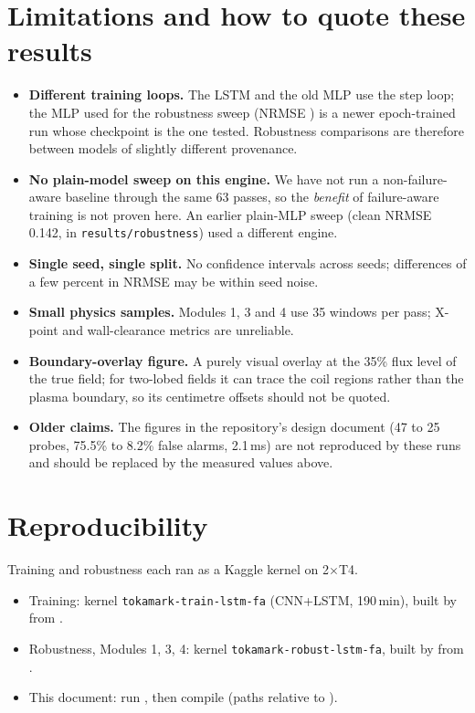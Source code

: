 \documentclass[11pt,a4paper]{article}
\begin{document}
\section{Limitations and how to quote these results}\label{sec:limits}
\begin{itemize}
  \item \textbf{Different training loops.} The LSTM and the old MLP use the step loop; the MLP used for the robustness sweep (NRMSE
        \NRMSEmlp) is a newer epoch-trained run whose checkpoint is the one tested. Robustness comparisons are therefore between
        models of slightly different provenance.
  \item \textbf{No plain-model sweep on this engine.} We have not run a non-failure-aware baseline through the same 63 passes, so the
        \emph{benefit} of failure-aware training is not proven here. An earlier plain-MLP sweep (clean NRMSE 0.142, in \texttt{results/robustness}) used a different engine.
  \item \textbf{Single seed, single split.} No confidence intervals across seeds; differences of a few percent in NRMSE may be within seed noise.
  \item \textbf{Small physics samples.} Modules 1, 3 and 4 use 35 windows per pass; X-point and wall-clearance metrics are unreliable.
  \item \textbf{Boundary-overlay figure.} A purely visual overlay at the 35\% flux level of the true field; for two-lobed fields it can trace the coil
        regions rather than the plasma boundary, so its centimetre offsets should not be quoted.
  \item \textbf{Older claims.} The figures in the repository's design document (47 to 25 probes, 75.5\% to 8.2\% false alarms, 2.1\,ms) are
        not reproduced by these runs and should be replaced by the measured values above.
\end{itemize}

\section{Reproducibility}
Training and robustness each ran as a Kaggle kernel on 2$\times$T4.
\begin{itemize}
  \item Training: kernel \texttt{tokamark-train-lstm-fa} (CNN+LSTM, 190\,min), built by  from .
  \item Robustness, Modules 1, 3, 4: kernel \texttt{tokamark-robust-lstm-fa}, built by  from .
  \item This document: run , then compile  (paths relative to ).
\end{itemize}
\end{document}
